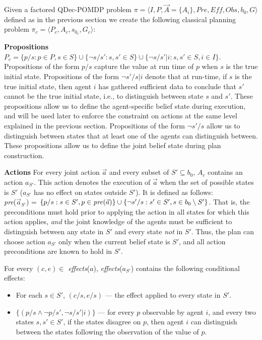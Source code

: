 \documentclass[letterpaper]{article}
\newcommand{\set}[1]{\{#1\}}
\theoremstyle{definition}
\begin{document}
Given a factored QDec-POMDP problem $\pi=\langle  I,P,\vec{A}=\{A_i\},\mathit{Pre},\mathit{Eff},\mathit{Obs},b_0,G\rangle$ defined as in the previous section we create the following classical planning problem $\pi_c=\langle P_c,A_c,s_{0_c},G_c\rangle$:

{\bf Propositions} $P_c = \set{p/s : p\in P , s\in S}\cup\set{\neg s/s' : s,s'\in S}\cup\set{\neg s/s'|i : s,s'\in S, i \in I}.$
Propositions of the form $p/s$ capture the value at run time of $p$ when $s$ is the true initial state.
Propositions of the form $\neg s'/s|i$ denote that at run-time, if $s$ is the true
initial state, then agent $i$ has gathered sufficient data to conclude that $s'$ cannot be the true initial state, i.e., to distinguish between state $s$ and $s'$. These propositions allow us to define the agent-specific belief state during execution, and will be used later to enforce the constraint on actions at the same level explained in the previous section.
Propositions of the form $\neg s'/s$ allow us to distinguish between states that at least one of the agents can distinguish between. These propositions allow us to define the joint belief state during plan construction.

{\bf Actions} For every joint action $\vec{a}$ and every subset of $S'\subseteq b_0$, $A_c$ contains an action $a_{S'}$. This action
denotes the execution of $\vec{a}$ when the set of possible states is $S'$ ($a_{S'}$ has no effect on states outside $S'$). It is defined as follows:\\
 \emph{pre}($\vec{a}_{S'}$) =  $\{p/s : s \in S', p\in \mbox{\emph{pre}}(\vec{a})\} \cup\{\neg s'/s : s' \in S', s \in b_0\setminus S'\}$. That is, the preconditions must hold prior to applying the action in all states for which this action applies, {\em and} the joint knowledge of the agents must be sufficient to distinguish between any state in $S'$ and every state {\em not} in $S'$. Thus, the plan can choose action $a_{S'}$ only when the current belief state is $S'$, and all action preconditions are known to hold in $S'$.

For every $(c,e)\in $ \emph{effects}($a$), \emph{effects}($a_{S'}$) contains the following conditional effects:
\begin{itemize}
\setlength{\itemsep}{-1pt}
\item For each $s \in S'$, $(c/s,e/s)$ --- the effect applied to every state in $S'$.
\item $\set{(p/s \wedge \neg p/s' , \neg s/s'|i)}$ --- for every $p$ observable by agent $i$, and every two states $s,s'\in S'$, if the states disagree on $p$, then agent $i$ can distinguish between the states following the observation of the value of $p$.
\end{itemize}
\end{document}
